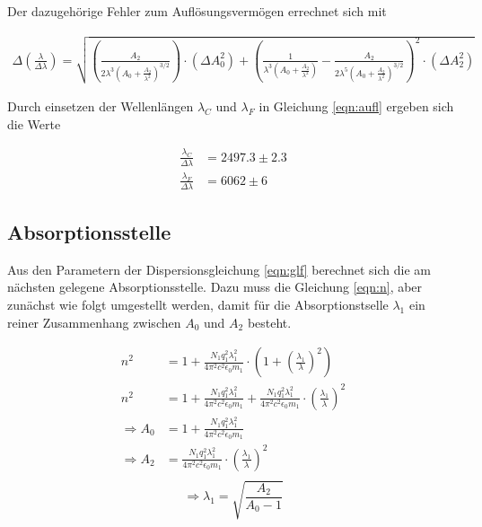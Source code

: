 Der dazugehörige Fehler zum Auflösungsvermögen errechnet sich mit

\begin{align*}
  \Delta \left(\frac{\lambda}{\Delta \lambda}\right) = \sqrt{\left(\frac{A_2}{2 \lambda^3 \left(A_0 + \frac{A_2}{\lambda^2}\right)^{3/2}}\right) \cdot \left(\Delta A_0^2\right) + \left(\frac{1}{\lambda^3 \left(A_0 + \frac{A_2}{\lambda^2}\right)} - \frac{A_2}{2 \lambda^5 \left(A_0 + \frac{A_2}{\lambda^2}\right)^{3/2}}\right)^2 \cdot \left(\Delta A_2^2\right)}
\end{align*}

Durch einsetzen der Wellenlängen $\lambda_C$ und $\lambda_F$ in Gleichung \eqref{eqn:aufl} ergeben sich die Werte

\begin{align*}
  \frac{\lambda_C}{\Delta \lambda} &= 2497.3 \pm 2.3 \\
  \frac{\lambda_F}{\Delta \lambda} &= 6062 \pm 6
\end{align*}

\subsection{Absorptionsstelle}

Aus den Parametern der Dispersionsgleichung \eqref{eqn:glf} berechnet sich die am nächsten gelegene Absorptionsstelle.
Dazu muss die Gleichung \eqref{eqn:n}, aber zunächst wie folgt umgestellt werden, damit für die Absorptionstselle $\lambda_1$ ein reiner Zusammenhang zwischen $A_0$ und $A_2$ besteht.

\begin{align*}
  n^2 &= 1 + \frac{N_1 q_1^2 \lambda_1^2}{4 \pi^2 c^2 \epsilon_0 m_1}\cdot\left(1+\left(\frac{\lambda_1}{\lambda}\right)^2\right) \\
  n^2 &= 1 + \frac{N_1 q_1^2 \lambda_1^2}{4 \pi^2 c^2 \epsilon_0 m_1} + \frac{N_1 q_1^2 \lambda_1^2}{4 \pi^2 c^2 \epsilon_0 m_1} \cdot \left(\frac{\lambda_1}{\lambda}\right)^2 \\
  \Rightarrow A_0 &= 1 + \frac{N_1 q_1^2 \lambda_1^2}{4 \pi^2 c^2 \epsilon_0 m_1} \\
  \Rightarrow A_2 &= \frac{N_1 q_1^2 \lambda_1^2}{4 \pi^2 c^2 \epsilon_0 m_1} \cdot \left(\frac{\lambda_1}{\lambda}\right)^2 \\
\end{align*}
\begin{equation}
  \Rightarrow \lambda_1 = \sqrt{\frac{A_2}{A_0-1}}
  \label{eqn:ausw1}
\end{equation}

